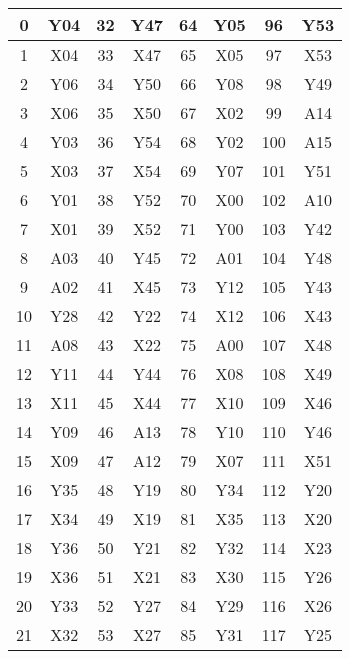 {\begin{tabular}{|c|c|c|c|c|c|c|c|}
  0      & Y04    & 32     & Y47    & 64     & Y05    & 96     & Y53    \\ \hline
  1      & X04    & 33     & X47    & 65     & X05    & 97     & X53    \\ \hline
  2      & Y06    & 34     & Y50    & 66     & Y08    & 98     & Y49    \\ \hline
  3      & X06    & 35     & X50    & 67     & X02    & 99     & A14    \\ \hline
  4      & Y03    & 36     & Y54    & 68     & Y02    & 100    & A15    \\ \hline
  5      & X03    & 37     & X54    & 69     & Y07    & 101    & Y51    \\ \hline
  6      & Y01    & 38     & Y52    & 70     & X00    & 102    & A10    \\ \hline
  7      & X01    & 39     & X52    & 71     & Y00    & 103    & Y42    \\ \hline
  8      & A03    & 40     & Y45    & 72     & A01    & 104    & Y48    \\ \hline
  9      & A02    & 41     & X45    & 73     & Y12    & 105    & Y43    \\ \hline
  10     & Y28    & 42     & Y22    & 74     & X12    & 106    & X43    \\ \hline
  11     & A08    & 43     & X22    & 75     & A00    & 107    & X48    \\ \hline
  12     & Y11    & 44     & Y44    & 76     & X08    & 108    & X49    \\ \hline
  13     & X11    & 45     & X44    & 77     & X10    & 109    & X46    \\ \hline
  14     & Y09    & 46     & A13    & 78     & Y10    & 110    & Y46    \\ \hline
  15     & X09    & 47     & A12    & 79     & X07    & 111    & X51    \\ \hline
  16     & Y35    & 48     & Y19    & 80     & Y34    & 112    & Y20    \\ \hline
  17     & X34    & 49     & X19    & 81     & X35    & 113    & X20    \\ \hline
  18     & Y36    & 50     & Y21    & 82     & Y32    & 114    & X23    \\ \hline
  19     & X36    & 51     & X21    & 83     & X30    & 115    & Y26    \\ \hline
  20     & Y33    & 52     & Y27    & 84     & Y29    & 116    & X26    \\ \hline
  21     & X32    & 53     & X27    & 85     & Y31    & 117    & Y25    \\ \hline

\end{tabular}}
